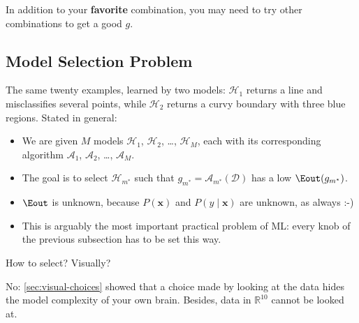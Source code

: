 \begin{moral}
    In addition to your \textbf{favorite} combination, you may need to try
    other combinations to get a good \(g\).
\end{moral}

\subsection{Model Selection Problem}

\begin{center}
\end{center}

The same twenty examples, learned by two models: \(\mathcal{H}_1\) returns a
line and misclassifies several points, while \(\mathcal{H}_2\) returns a
curvy boundary with three blue regions. Stated in general:
\begin{itemize}
    \item We are given \(M\) models \(\mathcal{H}_1\), \(\mathcal{H}_2\),
        \ldots, \(\mathcal{H}_M\), each with its corresponding algorithm
        \(\mathcal{A}_1\), \(\mathcal{A}_2\), \ldots, \(\mathcal{A}_M\).
    \item The goal is to select \(\mathcal{H}_{m^*}\) such that
        \(g_{m^*} = \mathcal{A}_{m^*}(\mathcal{D})\) has a low
        \(\Eout(g_{m^*})\).
    \item \(\Eout\) is unknown, because \(P(\bm{x})\) and \(P(y \mid \bm{x})\)
        are unknown, as always :-)
    \item This is arguably the most important practical problem of ML: every
        knob of the previous subsection has to be set this way.
\end{itemize}

\begin{question}
    How to select? Visually?
\end{question}

No: \autoref{sec:visual-choices} showed that a choice made by looking at the
data hides the model complexity of your own brain. Besides, data in
\(\mathbb{R}^{10}\) cannot be looked at.

